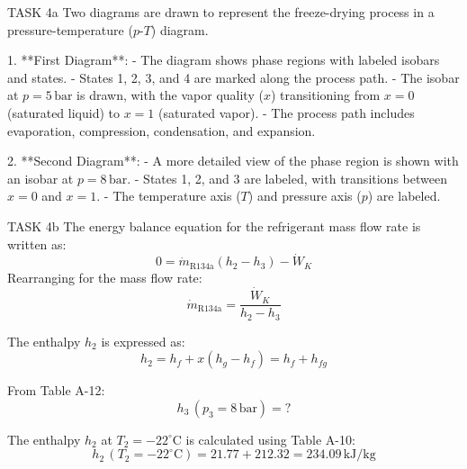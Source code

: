 TASK 4a  
Two diagrams are drawn to represent the freeze-drying process in a pressure-temperature (\(p\)-\(T\)) diagram.  

1. **First Diagram**:  
   - The diagram shows phase regions with labeled isobars and states.  
   - States 1, 2, 3, and 4 are marked along the process path.  
   - The isobar at \(p = 5 \, \text{bar}\) is drawn, with the vapor quality (\(x\)) transitioning from \(x = 0\) (saturated liquid) to \(x = 1\) (saturated vapor).  
   - The process path includes evaporation, compression, condensation, and expansion.  

2. **Second Diagram**:  
   - A more detailed view of the phase region is shown with an isobar at \(p = 8 \, \text{bar}\).  
   - States 1, 2, and 3 are labeled, with transitions between \(x = 0\) and \(x = 1\).  
   - The temperature axis (\(T\)) and pressure axis (\(p\)) are labeled.  

TASK 4b  
The energy balance equation for the refrigerant mass flow rate is written as:  
\[
0 = \dot{m}_{\text{R134a}} \left( h_2 - h_3 \right) - \dot{W}_K
\]  
Rearranging for the mass flow rate:  
\[
\dot{m}_{\text{R134a}} = \frac{\dot{W}_K}{h_2 - h_3}
\]  

The enthalpy \(h_2\) is expressed as:  
\[
h_2 = h_f + x \left( h_g - h_f \right) = h_f + h_{fg}
\]  

From Table A-12:  
\[
h_3 \, (p_3 = 8 \, \text{bar}) = ?
\]  

The enthalpy \(h_2\) at \(T_2 = -22^\circ\text{C}\) is calculated using Table A-10:  
\[
h_2 \, (T_2 = -22^\circ\text{C}) = 21.77 + 212.32 = 234.09 \, \text{kJ/kg}
\]